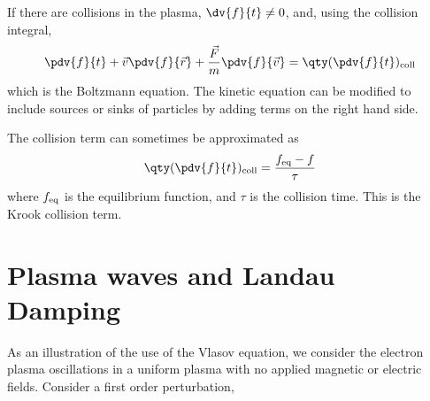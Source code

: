 \documentclass{book}         		                %
\begin{document}
If there are collisions in the plasma, $\dv{f}{t}\neq 0$, and, using
the collision integral,
\begin{equation}
  \label{eq:30}
  \pdv{f}{t} + \vec{v} \pdv{f}{\vec{r}} + \frac{\vec{F}}{m} \pdv{f}{\vec{v}} = \qty( \pdv{f}{t} )_{\rm coll} 
\end{equation}
which is the Boltzmann equation. The kinetic equation can be modified
to include sources or sinks of particles by adding terms on the right
hand side.

The collision term can sometimes be approximated as
\[ \qty( \pdv{f}{t} )_{\rm coll} = \frac{f_{\rm eq} - f}{\tau} \]
where $f_{\rm eq}$ is the equilibrium function, and $\tau$ is the
collision time. This is the Krook collision term.

\section{Plasma waves and Landau Damping}
\label{sec:plasma-waves-landau}

As an illustration of the use of the Vlasov equation, we consider the
electron plasma oscillations in a uniform plasma with no applied
magnetic or electric fields. Consider a first order perturbation,
\end{document}

